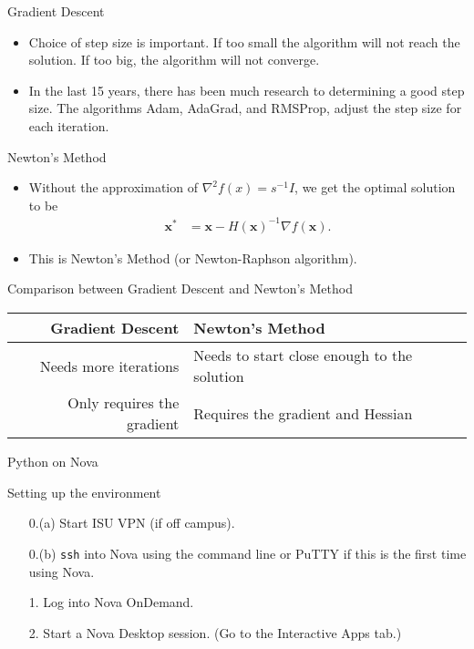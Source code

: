 \documentclass{beamer} %
\renewcommand{\bf}[1]{\mathbf{#1}}
\begin{document}
\begin{frame}{Gradient Descent}
  \begin{itemize}
    \item Choice of step size is important. If too small the algorithm will not
      reach the solution. If too big, the algorithm will not converge.
    \item In the last 15 years, there has been much research to determining a
      good step size. The algorithms Adam, AdaGrad, and RMSProp, adjust the step
      size for each iteration.
  \end{itemize}
\end{frame}

\begin{frame}{Newton's Method}
  \begin{itemize}
    \item Without the approximation of $\nabla^2 f(x) = s^{-1} I$, we get the
      optimal solution to be
      $$
      \begin{aligned}
        \bf x^* &= \bf x - H(\bf x)^{-1} \nabla f(\bf x).
      \end{aligned}
      $$
    \item This is Newton's Method (or Newton-Raphson algorithm).
  \end{itemize}
\end{frame}

\begin{frame}{Comparison between Gradient Descent and Newton's Method}
  \begin{table}[ht!]
    \centering
    \begin{tabular}{rp{6cm}}
      \toprule
      Gradient Descent & Newton's Method\\
      \midrule
      Needs more iterations & Needs to start close enough to the solution \\
      Only requires the gradient & Requires the gradient and Hessian\\
      \bottomrule
    \end{tabular}
  \end{table}
\end{frame}

\begin{frame}
  \begin{center}
    {\Large Python on Nova}
  \end{center}
\end{frame}

\begin{frame}{Setting up the environment}
  \begin{itemize}
    \item[0.(a)] Start ISU VPN (if off campus). 
    \item[0.(b)] \texttt{ssh} into Nova using the command line or PuTTY if this
      is the first time using Nova.
    \item[1.] Log into Nova OnDemand.
    \item[2.] Start a Nova Desktop session. (Go to the Interactive Apps tab.)
  \end{itemize}
\end{frame}
\end{document}
